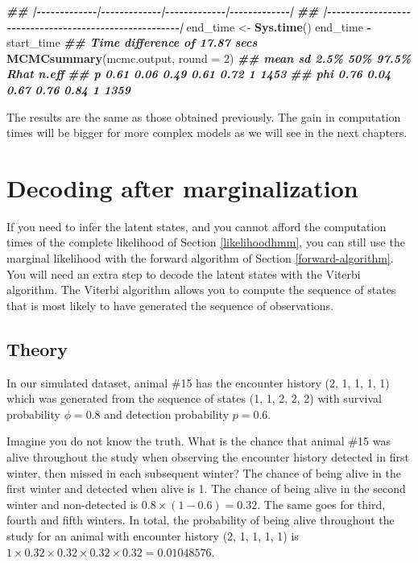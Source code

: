 \documentclass[
  12pt,
]{krantz}
\newenvironment{Shaded}{\begin{snugshade}}{\end{snugshade}}
\newcommand{\AttributeTok}[1]{\textcolor[rgb]{0.13,0.29,0.53}{#1}}
\newcommand{\DecValTok}[1]{\textcolor[rgb]{0.00,0.00,0.81}{#1}}
\newcommand{\DocumentationTok}[1]{\textcolor[rgb]{0.56,0.35,0.01}{\textbf{\textit{#1}}}}
\newcommand{\FunctionTok}[1]{\textcolor[rgb]{0.13,0.29,0.53}{\textbf{#1}}}
\newcommand{\NormalTok}[1]{#1}
\newcommand{\OtherTok}[1]{\textcolor[rgb]{0.56,0.35,0.01}{#1}}
\newcommand{\SpecialCharTok}[1]{\textcolor[rgb]{0.81,0.36,0.00}{\textbf{#1}}}
\begin{document}
\begin{Shaded}
\begin{Highlighting}[]
\DocumentationTok{\#\# |{-}{-}{-}{-}{-}{-}{-}{-}{-}{-}{-}{-}{-}|{-}{-}{-}{-}{-}{-}{-}{-}{-}{-}{-}{-}{-}|{-}{-}{-}{-}{-}{-}{-}{-}{-}{-}{-}{-}{-}|{-}{-}{-}{-}{-}{-}{-}{-}{-}{-}{-}{-}{-}|}
\DocumentationTok{\#\# |{-}{-}{-}{-}{-}{-}{-}{-}{-}{-}{-}{-}{-}{-}{-}{-}{-}{-}{-}{-}{-}{-}{-}{-}{-}{-}{-}{-}{-}{-}{-}{-}{-}{-}{-}{-}{-}{-}{-}{-}{-}{-}{-}{-}{-}{-}{-}{-}{-}{-}{-}{-}{-}{-}{-}|}
\NormalTok{end\_time }\OtherTok{\textless{}{-}} \FunctionTok{Sys.time}\NormalTok{()}
\NormalTok{end\_time }\SpecialCharTok{{-}}\NormalTok{ start\_time}
\DocumentationTok{\#\# Time difference of 17.87 secs}
\FunctionTok{MCMCsummary}\NormalTok{(mcmc.output, }\AttributeTok{round =} \DecValTok{2}\NormalTok{)}
\DocumentationTok{\#\#     mean   sd 2.5\%  50\% 97.5\% Rhat n.eff}
\DocumentationTok{\#\# p   0.61 0.06 0.49 0.61  0.72    1  1453}
\DocumentationTok{\#\# phi 0.76 0.04 0.67 0.76  0.84    1  1359}
\end{Highlighting}
\end{Shaded}

The results are the same as those obtained previously. The gain in computation times will be bigger for more complex models as we will see in the next chapters.

\hypertarget{decoding}{%
\section{Decoding after marginalization}\label{decoding}}

If you need to infer the latent states, and you cannot afford the computation times of the complete likelihood of Section \ref{likelihoodhmm}, you can still use the marginal likelihood with the forward algorithm of Section \ref{forward-algorithm}. You will need an extra step to decode the latent states with the Viterbi algorithm. The Viterbi algorithm allows you to compute the sequence of states that is most likely to have generated the sequence of observations.

\hypertarget{viterbi-theory}{%
\subsection{Theory}\label{viterbi-theory}}

In our simulated dataset, animal \#15 has the encounter history (2, 1, 1, 1, 1) which was generated from the sequence of states (1, 1, 2, 2, 2) with survival probability \(\phi = 0.8\) and detection probability \(p = 0.6\).

Imagine you do not know the truth. What is the chance that animal \#15 was alive throughout the study when observing the encounter history detected in first winter, then missed in each subsequent winter? The chance of being alive in the first winter and detected when alive is 1. The chance of being alive in the second winter and non-detected is \(0.8 \times (1-0.6) = 0.32\). The same goes for third, fourth and fifth winters. In total, the probability of being alive throughout the study for an animal with encounter history (2, 1, 1, 1, 1) is \(1 \times 0.32 \times 0.32 \times 0.32 \times 0.32 = 0.01048576\).
\end{document}
